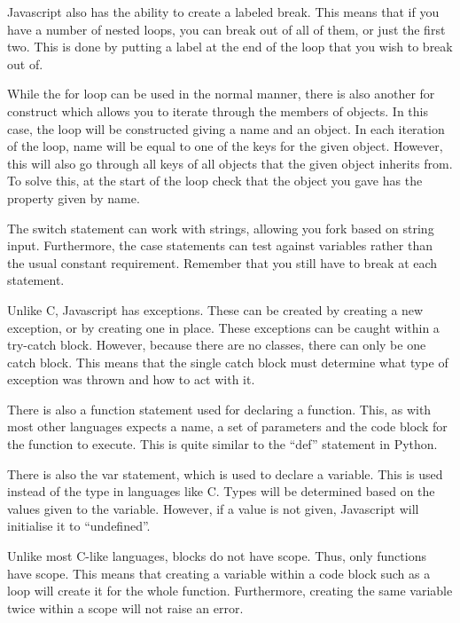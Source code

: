 \documentclass[a4paper,11pt]{report}
\begin{document}
			Javascript also has the ability to create a labeled break. 
			This means that if you have a number of nested loops, you can break out of all of them, or just the first two. 
			This is done by putting a label at the end of the loop that you wish to break out of. 

			While the for loop can be used in the normal manner, 
			there is also another for construct which allows you to iterate through the members of objects. 
			In this case, the loop will be constructed giving a name and an object. 
			In each iteration of the loop, name will be equal to one of the keys for the given object. 
			However, this will also go through all keys of all objects that the given object inherits from. 
			To solve this, at the start of the loop check that the object you gave has the property given by name. 

			The switch statement can work with strings, allowing you fork based on string input. 
			Furthermore, the case statements can test against variables rather than the usual constant requirement. 
			Remember that you still have to break at each statement. 

			Unlike C, Javascript has exceptions. 
			These can be created by creating a new exception, or by creating one in place. 
			These exceptions can be caught within a try-catch block. 
			However, because there are no classes, there can only be one catch block. 
			This means that the single catch block must determine what type of exception was thrown and how to act with it. 

			There is also a function statement used for declaring a function. 
			This, as with most other languages expects a name, a set of parameters and the code block for the function to execute. 
			This is quite similar to the ``def'' statement in Python. 

			There is also the var statement, which is used to declare a variable. 
			This is used instead of the type in languages like C. 
			Types will be determined based on the values given to the variable.
			However, if a value is not given, Javascript will initialise it to ``undefined''. 

			Unlike most C-like languages, blocks do not have scope. 
			Thus, only functions have scope. 
			This means that creating a variable within a code block such as a loop will create it for the whole function. 
			Furthermore, creating the same variable twice within a scope will not raise an error. 
\end{document}
